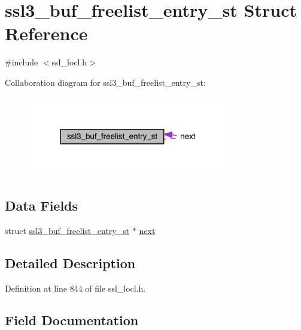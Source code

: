 \hypertarget{structssl3__buf__freelist__entry__st}{}\section{ssl3\+\_\+buf\+\_\+freelist\+\_\+entry\+\_\+st Struct Reference}
\label{structssl3__buf__freelist__entry__st}


{\ttfamily \#include $<$ssl\+\_\+locl.\+h$>$}



Collaboration diagram for ssl3\+\_\+buf\+\_\+freelist\+\_\+entry\+\_\+st\+:\nopagebreak
\begin{figure}[H]
\begin{center}
\leavevmode
\includegraphics[width=249pt]{structssl3__buf__freelist__entry__st__coll__graph}
\end{center}
\end{figure}
\subsection*{Data Fields}
\begin{DoxyCompactItemize}
\item 
struct \hyperlink{structssl3__buf__freelist__entry__st}{ssl3\+\_\+buf\+\_\+freelist\+\_\+entry\+\_\+st} $\ast$ \hyperlink{structssl3__buf__freelist__entry__st_a1ba48f1eac6f6ceabd7864a71cbf58b2}{next}
\end{DoxyCompactItemize}


\subsection{Detailed Description}


Definition at line 844 of file ssl\+\_\+locl.\+h.



\subsection{Field Documentation}
